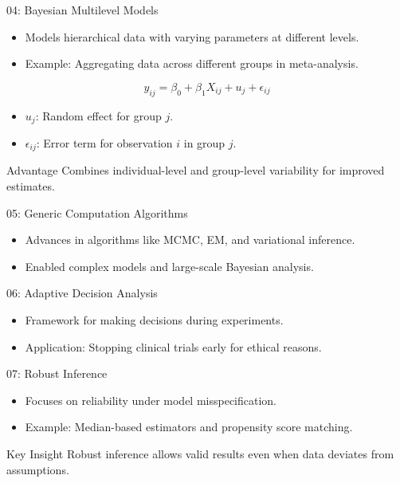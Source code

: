 \documentclass{beamer}
\begin{document}
\begin{frame}{04: Bayesian Multilevel Models}
\begin{itemize}
    \item Models hierarchical data with varying parameters at different levels.
    \item Example: Aggregating data across different groups in meta-analysis.
\end{itemize}

\[
y_{ij} = \beta_0 + \beta_1 X_{ij} + u_j + \epsilon_{ij}
\]
\begin{itemize}
    \item \( u_j \): Random effect for group \( j \).
    \item \( \epsilon_{ij} \): Error term for observation \( i \) in group \( j \).
\end{itemize}

\begin{block}{Advantage}
Combines individual-level and group-level variability for improved estimates.
\end{block}
\end{frame}

\begin{frame}{05: Generic Computation Algorithms}
\begin{itemize}
    \item Advances in algorithms like MCMC, EM, and variational inference.
    \item Enabled complex models and large-scale Bayesian analysis.
\end{itemize}
\end{frame}

\begin{frame}{06: Adaptive Decision Analysis}
\begin{itemize}
    \item Framework for making decisions during experiments.
    \item Application: Stopping clinical trials early for ethical reasons.
\end{itemize}
\end{frame}

\begin{frame}{07: Robust Inference}
\begin{itemize}
    \item Focuses on reliability under model misspecification.
    \item Example: Median-based estimators and propensity score matching.
\end{itemize}

\begin{block}{Key Insight}
Robust inference allows valid results even when data deviates from assumptions.
\end{block}
\end{frame}
\end{document}
